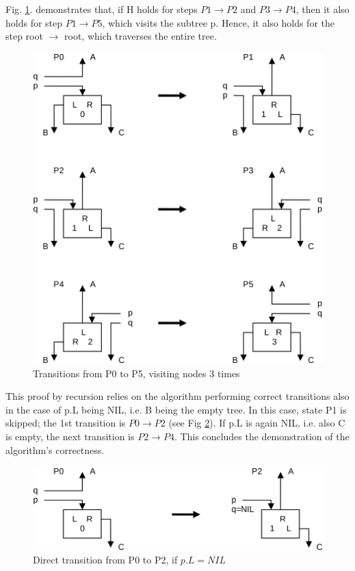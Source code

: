 Fig. \ref{fig:transition-3-times}. demonstrates that, if H holds for steps $P1 \rightarrow P2$
and $P3 \rightarrow P4$, then it also holds for step $P1 \rightarrow P5$, which visits the
subtree p. Hence, it also holds for the step root $\rightarrow$ root, which traverses the entire tree.
\begin{figure}[h!]
  \label{fig:transition-3-times}
  \centering
  \includegraphics[width=.9\textwidth]{i/v}
  \caption{Transitions from P0 to P5, visiting nodes 3 times}
\end{figure}

This proof by recursion relies on the algorithm performing correct transitions also in the
case of p.L being NIL, i.e. B being the empty tree. In this case, state P1 is skipped; the
1st transition is $P0 \rightarrow P2$ (see Fig \ref{fig:transition-direct}).
If p.L is again NIL, i.e. also C is empty, the next transition is $P2 \rightarrow P4$.
This concludes the demonstration of the algorithm's correctness.
\begin{figure}[h!]
  \label{fig:transition-direct}
  \centering
  \includegraphics[width=\textwidth]{i/w}
  \caption{Direct transition from P0 to P2, if $p.L = NIL$}
\end{figure}

